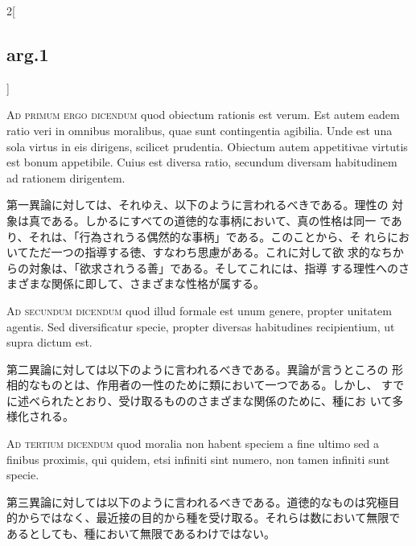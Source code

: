 \documentclass[paper=a4paper,fontsize=10pt,jafontsize=9pt,titlepage]{jlreq}
\begin{document}
\begin{paracol}{2}[\subsection{arg.1}]
\switchcolumn*[\subsection{ad.1}]

{\scshape Ad primum ergo dicendum} quod obiectum rationis est
verum. Est autem eadem ratio veri in omnibus moralibus, quae sunt
contingentia agibilia. Unde est una sola virtus in eis dirigens,
scilicet prudentia. Obiectum autem appetitivae virtutis est bonum
appetibile. Cuius est diversa ratio, secundum diversam habitudinem ad
rationem dirigentem.

\switchcolumn

第一異論に対しては、それゆえ、以下のように言われるべきである。理性の
 対象は真である。しかるにすべての道徳的な事柄において、真の性格は同一
 であり、それは、「行為されうる偶然的な事柄」である。このことから、そ
 れらにおいてただ一つの指導する徳、すなわち思慮がある。これに対して欲
 求的なちからの対象は、「欲求されうる善」である。そしてこれには、指導
 する理性へのさまざまな関係に即して、さまざまな性格が属する。

\switchcolumn*[\subsection{ad.2}]

{\scshape Ad secundum dicendum} quod illud formale est unum genere,
propter unitatem agentis. Sed diversificatur specie, propter diversas
habitudines recipientium, ut supra dictum est.

\switchcolumn

第二異論に対しては以下のように言われるべきである。異論が言うところの
 形相的なものとは、作用者の一性のために類において一つである。しかし、
 すでに述べられたとおり、受け取るもののさまざまな関係のために、種にお
 いて多様化される。

\switchcolumn*[\subsection{ad.3}]

{\scshape Ad tertium dicendum} quod moralia non habent speciem a fine
ultimo sed a finibus proximis, qui quidem, etsi infiniti sint numero,
non tamen infiniti sunt specie.

\switchcolumn

第三異論に対しては以下のように言われるべきである。道徳的なものは究極目
的からではなく、最近接の目的から種を受け取る。それらは数において無限で
あるとしても、種において無限であるわけではない。

\end{paracol}
\newpage
{}
{}
\setcounter{section}{2}
\setcounter{subsection}{0}
\end{document}
